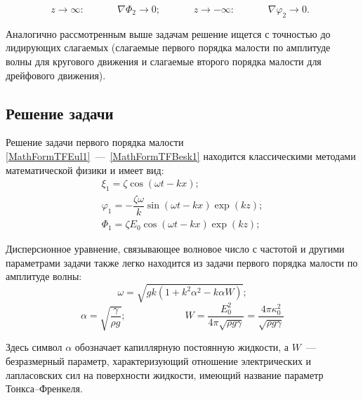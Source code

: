 \begin{equation}
z\rightarrow \infty: \mspace{60mu}\nabla \Phi_{2} \rightarrow 0; \mspace{60mu} z\rightarrow - \infty: \mspace{60mu} \nabla \varphi_{2} \rightarrow 0.\mspace{9mu} \label{MathFormTFBesk2}
\end{equation}


Аналогично рассмотренным выше задачам решение ищется с точностью до лидирующих слагаемых (слагаемые первого порядка малости по амплитуде волны для кругового движения и слагаемые второго порядка малости для дрейфового движения).


 \subsection{Решение задачи}
 
Решение задачи первого порядка малости \eqref{MathFormTFEul1}~---~\eqref{MathFormTFBesk1} находится классическими методами математической физики и имеет вид:
\begin{gather}
\xi_{1}=\zeta \cos \left( \omega t - k x \right);\label{xi1TF}
\\
\varphi_{1}=-\dfrac{\zeta \omega}{k} \sin \left( \omega t - k x \right) \exp \left( k z \right);\label{varphi1TF}
\\
\Phi_{1}=\zeta E_{0} \cos \left( \omega t - k x \right) \exp \left( k z \right);\label{Phi1TF}
\end{gather}	
	  	
Дисперсионное уравнение, связывающее волновое число с частотой и другими параметрами задачи также легко находится из задачи первого порядка малости по амплитуде волны:
\begin{equation}
\omega = \sqrt{gk \left( 1+k^{2}\alpha^{2}-k\alpha W \right)};
\label{DUTF}
\end{equation}
\begin{equation*}
\alpha=\sqrt{\dfrac{\gamma}{\rho g}}; \qquad \qquad \qquad W=\dfrac{E_{0}^{2}}{4\pi \sqrt{\rho g \gamma}}=\dfrac{4 \pi \kappa_{0}^{2}}{\sqrt{\rho g \gamma}}
\end{equation*}
	  		  
Здесь символ  $ \alpha $ обозначает капиллярную постоянную жидкости, а $ W $~--- безразмерный параметр, характеризующий отношение электрических и лапласовских сил на поверхности жидкости, имеющий название параметр Тонкса--Френкеля. 

